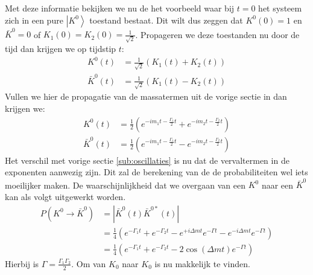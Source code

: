 \documentclass[../main.tex]{subfiles}
\begin{document}
Met deze informatie bekijken we nu de het voorbeeld waar bij $t=0$ het systeem zich in een pure $\left| K^0 \right>$ toestand bestaat. Dit wilt dus zeggen dat $K^0(0) = 1$ en $\bar{K}^0 = 0$ of $K_1(0)=K_2(0)= \frac{1}{\sqrt{2}} $. Propageren we deze toestanden nu door de tijd dan krijgen we op tijdstip $t$:
\begin{equation}
    \begin{aligned}
        \label{eq:voorbeeld_kaon_osc_tijd_prop_1}
        K^{0}(t) &=\frac{1}{\sqrt{2}}\left(K_{1}(t)+K_{2}(t)\right) \\
        \bar{K}^{0}(t) &=\frac{1}{\sqrt{2}}\left(K_{1}(t)-K_{2}(t)\right)
    \end{aligned}
\end{equation}
Vullen we hier de propagatie van de massatermen uit de vorige sectie in dan krijgen we:
\begin{equation}
    \begin{aligned}
        \label{eq:voorbeeld_kaon_osc_tijd_prop_2}
        K^{0}(t) &=\frac{1}{2}\left(e^{-i m_{1} t-\frac{\Gamma_{1}}{2} t}+e^{-i m_{2} t-\frac{\Gamma_{2}}{2} t}\right) \\
        \bar{K}^{0}(t) &=\frac{1}{2}\left(e^{-i m_{1} t-\frac{\Gamma_{1}}{2} t}-e^{-i m_{2} t-\frac{\Gamma_{2}}{2} t}\right)
    \end{aligned}
\end{equation}
Het verschil met vorige sectie \ref{sub:oscillaties} is nu dat de vervaltermen in de exponenten aanwezig zijn. Dit zal de berekening van de de probabiliteiten wel iets moeilijker maken. De waarschijnlijkheid dat we overgaan van een $K^0$ naar een $\bar{K}^0$ kan als volgt uitgewerkt worden.
\begin{equation}
    \begin{aligned}
        \label{eq:voorbeeld_kaon_osc_tijd_prop_3}
        P\left(K^{0} \rightarrow \bar{K}^{0}\right) &=\left|\bar{K}^{0}(t) \bar{K}^{0 *}(t)\right| \\
                                                    &=\frac{1}{4}\left(e^{-\Gamma_{1} t}+e^{-\Gamma_{2} t}-e^{+i \Delta m t} e^{-\Gamma t}-e^{-i \Delta m t} e^{-\Gamma t}\right) \\
                                                    &=\frac{1}{4}\left(e^{-\Gamma_{1} t}+e^{-\Gamma_{2} t}-2 \cos (\Delta m t) e^{-\Gamma t}\right)
    \end{aligned}
\end{equation}
Hierbij is $\Gamma = \frac{\Gamma_1 \Gamma_2}{2}$. Om van $K_0$ naar $K_0$ is nu makkelijk te vinden.
\end{document}
